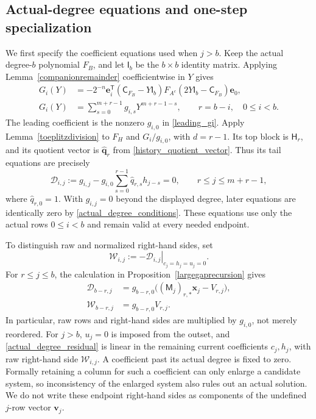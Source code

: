 \documentclass[12pt]{article}
\theoremstyle{remark}
\begin{document}
\subsection{Actual-degree equations and one-step specialization}\label{app:degreeboundary}

We first specify the coefficient equations used when $j>b$.
Keep the actual degree-$b$ polynomial $F_B$, and let $\mathsf I_b$ be
the $b\times b$ identity matrix.  Applying
Lemma~\ref{companionremainder} coefficientwise in $Y$ gives
\begin{equation}\label{actual_degree_remainder}
 \begin{aligned}
 G_i(Y)&=-2^{-n}\mathbf e_i^{\mathsf T}
  (\mathsf C_{F_B}-Y\mathsf I_b)
  F_{A^c}(2Y\mathsf I_b-\mathsf C_{F_B})\mathbf e_0,\\
 G_i(Y)&=\sum_{s=0}^{m+r-1}g_{i,s}Y^{m+r-1-s},
 \qquad r=b-i,\quad 0\le i<b.
 \end{aligned}
\end{equation}
The leading coefficient is the nonzero $g_{i,0}$ in \eqref{leading_gi}.
Apply Lemma~\ref{toeplitzdivision} to $F_H$ and $G_i/g_{i,0}$, with
$d=r-1$.  Its top block is $\mathsf H_r$, and its quotient vector is
$\widehat{\mathbf q}_r$ from \eqref{history_quotient_vector}.
Thus its tail equations are precisely
\begin{equation}\label{actual_degree_residual}
 \mathcal D_{i,j}:=g_{i,j}
   -g_{i,0}\sum_{s=0}^{r-1}\widehat q_{r,s}h_{j-s}=0,
 \qquad r\le j\le m+r-1,
\end{equation}
where $\widehat q_{r,0}=1$.  With $g_{i,j}=0$ beyond the displayed
degree, later equations are identically zero by
\eqref{actual_degree_conditions}.  These equations use only the
actual rows $0\le i<b$ and remain valid at every needed endpoint.

To distinguish raw and normalized right-hand sides, set
\begin{equation}\label{actual_degree_rhs}
 \mathcal W_{i,j}:=
 -\left.\mathcal D_{i,j}\right|_{c_j=h_j=u_j=0}.
\end{equation}
For $r\le j\le b$, the calculation in
Proposition~\ref{largegaprecursion} gives
\begin{equation}\label{actual_degree_normalization}
 \begin{aligned}
 \mathcal D_{b-r,j}
   &=g_{b-r,0}\bigl((\mathsf M_j)_{r,*}\mathbf x_j-V_{r,j}\bigr),\\
 \mathcal W_{b-r,j}&=g_{b-r,0}V_{r,j}.
 \end{aligned}
\end{equation}
In particular, raw rows and right-hand sides are multiplied by
$g_{i,0}$, not merely reordered.  For $j>b$, $u_j=0$ is imposed from
the outset, and \eqref{actual_degree_residual} is linear in the
remaining current coefficients $c_j,h_j$, with raw right-hand side
$\mathcal W_{i,j}$.  A coefficient past its actual degree is fixed to
zero.  Formally retaining a column for such a coefficient can only
enlarge a candidate system, so inconsistency of the enlarged system also rules out an actual
solution.  We do not write these endpoint
right-hand sides as components of the undefined $j$-row vector
$\mathbf v_j$.
\end{document}
